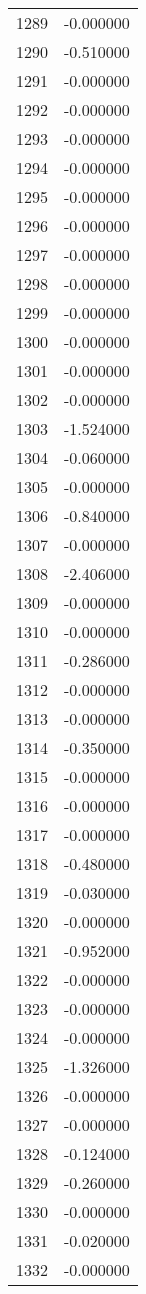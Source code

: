 \documentclass[12pt]{article}
\begin{document}
\begin{longtable}{@{}cc@{}}
1289 & -0.000000 \\
1290 & -0.510000 \\
1291 & -0.000000 \\
1292 & -0.000000 \\
1293 & -0.000000 \\
1294 & -0.000000 \\
1295 & -0.000000 \\
1296 & -0.000000 \\
1297 & -0.000000 \\
1298 & -0.000000 \\
1299 & -0.000000 \\
1300 & -0.000000 \\
1301 & -0.000000 \\
1302 & -0.000000 \\
1303 & -1.524000 \\
1304 & -0.060000 \\
1305 & -0.000000 \\
1306 & -0.840000 \\
1307 & -0.000000 \\
1308 & -2.406000 \\
1309 & -0.000000 \\
1310 & -0.000000 \\
1311 & -0.286000 \\
1312 & -0.000000 \\
1313 & -0.000000 \\
1314 & -0.350000 \\
1315 & -0.000000 \\
1316 & -0.000000 \\
1317 & -0.000000 \\
1318 & -0.480000 \\
1319 & -0.030000 \\
1320 & -0.000000 \\
1321 & -0.952000 \\
1322 & -0.000000 \\
1323 & -0.000000 \\
1324 & -0.000000 \\
1325 & -1.326000 \\
1326 & -0.000000 \\
1327 & -0.000000 \\
1328 & -0.124000 \\
1329 & -0.260000 \\
1330 & -0.000000 \\
1331 & -0.020000 \\
1332 & -0.000000 \\

\end{longtable}
\end{document}
